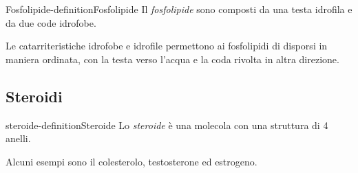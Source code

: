 \documentclass[preview]{standalone}
\begin{document}
\begin{snippetdefinition}{Fosfolipide-definition}{Fosfolipide}
    Il \textit{fosfolipide} sono composti da una testa idrofila e da due code idrofobe.
\end{snippetdefinition}

\begin{plainhtml}
    Le catarriteristiche idrofobe e idrofile permettono ai fosfolipidi di disporsi in maniera ordinata,
    con la testa verso l'acqua e la coda rivolta in altra direzione.
\end{plainhtml}

\subsection{Steroidi}

\begin{snippetdefinition}{steroide-definition}{Steroide}
    Lo \textit{steroide} è una molecola con una struttura di 4 anelli.
\end{snippetdefinition}

\begin{plainhtml}
    Alcuni esempi sono il colesterolo, testosterone ed estrogeno.
\end{plainhtml}
\end{document}
